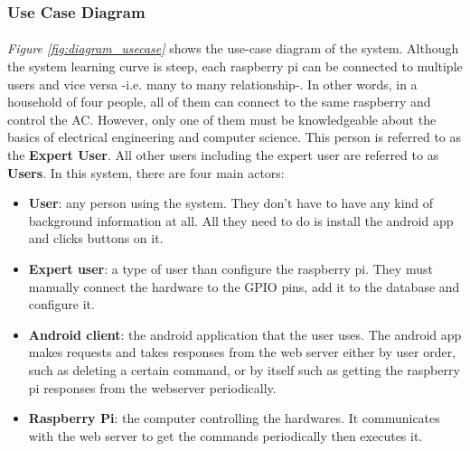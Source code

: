 \documentclass[12pt, oneside, a4paper]{book}
\newcommand\boldcolor[1]{\textcolor{bold}{\textbf{#1}}}
\begin{document}
				\subsubsection{Use Case Diagram}
				\paragraph{} \textit{Figure \ref{fig:diagram_usecase}} shows the use-case diagram of the system. Although the system learning curve is steep, each raspberry pi can be connected to multiple users and vice versa -i.e. many to many relationship-. In other words, in a household of four people, all of them can connect to the same raspberry and control the AC. However, only one of them must be knowledgeable about the basics of electrical engineering and computer science. This person is referred to as the \textbf{Expert User}. All other users including the expert user are referred to as \textbf{Users}. 
				 In this system, there are four main actors:
				\begin{itemize}
					\item \boldcolor{User}: any person using the system. They don't have to have any kind of background information at all. All they need to do is install the android app and clicks buttons on it. 
					\item \boldcolor{Expert user}: a type of user than configure the raspberry pi. They must manually connect the hardware to the GPIO pins, add it to the database and configure it. 
					\item \boldcolor{Android client}: the android application that the user uses. The android app makes requests and takes responses from the web server either by user order, such as deleting a certain command, or by itself such as getting the raspberry pi responses from the webserver periodically. 
					\item \boldcolor{Raspberry Pi}: the computer controlling the hardwares. It communicates with the web server to get the commands periodically then executes it.
				\end{itemize}
\end{document}

